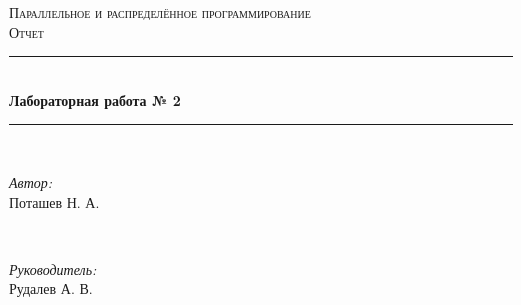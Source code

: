 \documentclass[12pt]{article}
\begin{document}
\begin{titlepage}

\newcommand{\HRule}{\rule{\linewidth}{0.5mm}} 
\centering 
\textsc{\LARGE Параллельное и распределённое программирование }\\[0.5cm] 
\textsc{\Large Отчет }\\[0.5cm] 
\HRule \\[0.4cm]
{ \huge \bfseries Лабораторная работа № 2}\\[0.4cm]
\HRule \\[1.5cm]

\begin{minipage}{0.4\textwidth}
\begin{flushleft} \large
\emph{Автор:}\\
Поташев Н. А.\\
\end{flushleft}
\end{minipage}
~
\begin{minipage}{0.4\textwidth}
\begin{flushright} \large
\emph{Руководитель:} \\
Рудалев А. В.
\end{flushright}
\end{minipage}\\[2cm]


\end{titlepage}
\end{document}
